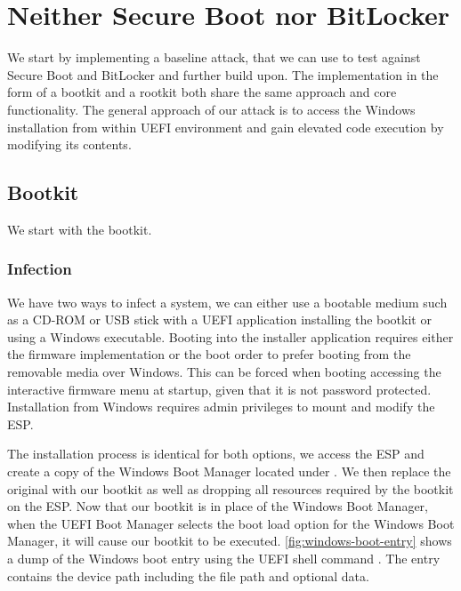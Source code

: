 
\section{Neither Secure Boot nor BitLocker}

We start by implementing a baseline attack, that we can use to test against Secure Boot and BitLocker and further build upon.
The implementation in the form of a bootkit and a rootkit both share the same approach and core functionality.
The general approach of our attack is to access the Windows installation from within \ac{UEFI} environment and gain elevated code execution by modifying its contents.

\subsection{Bootkit}
\label{sec:attacks:neither:bootkit}

We start with the bootkit.

\subsubsection{Infection}

We have two ways to infect a system, we can either use a bootable medium such as a CD-ROM or \ac{USB} stick with a \ac{UEFI} application installing the bootkit or using a Windows executable.
Booting into the installer application requires either the firmware implementation or the boot order to prefer booting from the removable media over Windows.
This can be forced when booting accessing the interactive firmware menu at startup, given that it is not password protected.
Installation from Windows requires admin privileges to mount and modify the \ac{ESP}.

The installation process is identical for both options, we access the \ac{ESP} and create a copy of the Windows Boot Manager located under .
We then replace the original with our bootkit as well as dropping all resources required by the bootkit on the \ac{ESP}.
Now that our bootkit is in place of the Windows Boot Manager, when the \ac{UEFI} Boot Manager selects the boot load option for the Windows Boot Manager, it will cause our bootkit to be executed.
\autoref{fig:windows-boot-entry} shows a dump of the Windows boot entry using the \ac{UEFI} shell command .
The entry contains the device path including the file path and optional data.

